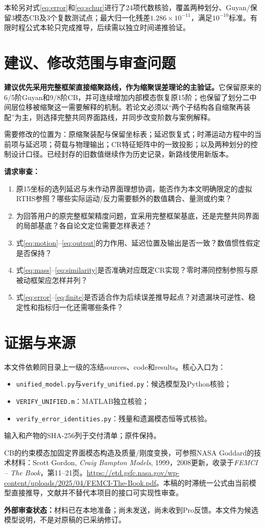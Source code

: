\documentclass[UTF8,11pt,a4paper]{ctexart}
\begin{document}
本轮另对式\eqref{eq:error}和\eqref{eq:schur}进行了24项代数核验，覆盖两种划分、Guyan/保留3模态CB及3个复数测试点；最大归一化残差$1.286\times10^{-11}$，满足$10^{-10}$标准。有限时程公式本轮只完成推导，后续需以独立时间递推验证。

\section{建议、修改范围与审查问题}

\textbf{建议优先采用完整框架直接缩聚路线，作为缩聚误差理论的主验证。}它保留原来的6/5阶Guyan和9/8阶CB，并可连续增加内部模态恢复原15阶；也保留了划分二中间层位移被缩聚这一需要解释的机制。若论文必须以“两个子结构各自缩聚再装配”为主，则选择完整共同界面路线，并同步改变阶数与案例解释。

需要修改的位置为：原缩聚装配与保留坐标表；延迟恢复式；时滞运动方程中的当前项与延迟项；荷载与物理输出；CR特征矩阵中的一致投影；以及两种划分的控制设计口径。已经封存的旧数值继续作为历史记录，新路线使用新版本。

\textbf{请求审查：}
\begin{enumerate}
\item 原15坐标的选列延迟与未作动界面理想协调，能否作为本文明确限定的虚拟RTHS参照？哪些实际运动/反力需要额外的数值耦合、量测或约束？
\item 为回答用户的原完整框架精度问题，宜采用完整框架基底，还是完整共同界面的局部基底？各自论文定位需要怎样表述？
\item 式\eqref{eq:motion}--\eqref{eq:output}的力作用、延迟位置及输出是否一致？数值惯性假定是否保持？
\item 式\eqref{eq:mass}--\eqref{eq:similarity}是否准确对应既定CR实现？零时滞同控制参照与原被动框架应怎样并列？
\item 式\eqref{eq:error}--\eqref{eq:finite}是否适合作为后续误差推导起点？对遗漏块可逆性、稳定性和指标归一化还需哪些条件？
\end{enumerate}

\section*{证据与来源}
本文件依赖同目录上一级的冻结sources、code和results。核心入口为：
\begin{itemize}
\item \texttt{unified\_model.py}与\texttt{verify\_unified.py}：候选模型及Python核验；
\item \texttt{VERIFY\_UNIFIED.m}：MATLAB独立核验；
\item \texttt{verify\_error\_identities.py}：残量和遗漏模态恒等式核验。
\end{itemize}
输入和产物的SHA-256列于交付清单；原件保持。

CB的约束模态加固定界面模态构造及质量/刚度变换，可参照NASA Goddard的技术材料：Scott Gordon, \emph{Craig Bampton Models}, 1999，2008更新，收录于\emph{FEMCI -- The Book}，第11--21页。\url{https://etd.gsfc.nasa.gov/wp-content/uploads/2025/04/FEMCI-The-Book.pdf}。本稿的时滞统一公式由当前模型直接推导，文献并不替代本项目的接口可实现性审查。

\textbf{外部审查状态：}材料已在本地准备；尚未发送，尚未收到Pro反馈。本文件为候选模型说明，不是对原稿的已采纳修订。
\end{document}
